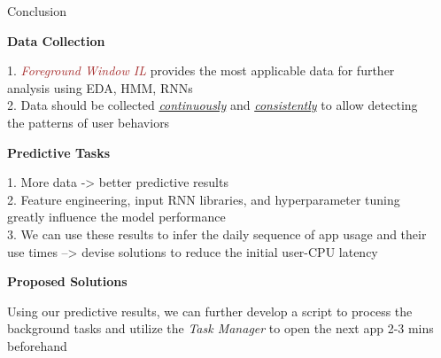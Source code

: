 \documentclass[final]{beamer}
\newlength{\sepwidth}
\newlength{\colwidth}
\newcommand{\separatorcolumn}{\begin{column}{\sepwidth}\end{column}}
\begin{document}
\begin{frame}[t]
\begin{columns}[t]
\begin{column}{\colwidth}
\begin{block}
  \end{block}
    \begin{block} {\LARGE{Conclusion}}

    \begin{itemize}
      \large{
      \item \textbf{Data Collection} 
      
      1.  \textcolor{brown}{\textit{Foreground Window IL}} provides the most applicable data for further analysis using EDA, HMM, RNNs \\
      2. Data should be collected \underline{\textit{continuously}} and \underline{\textit{consistently}} to allow detecting the patterns of user behaviors 
      \item \textbf{Predictive Tasks} 
      
      1. More data -> better predictive results \\
      2. Feature engineering, input RNN libraries, and hyperparameter tuning greatly influence the model performance \\
      3. We can use these results to infer the daily sequence of app usage and their use times --> devise solutions to reduce the initial user-CPU latency
    
      \item \textbf{Proposed Solutions}
      
      Using our predictive results, we can further develop a script to process the background tasks and utilize the \textit{Task Manager} to open the next app 2-3 mins beforehand \\
      }
      
    \end{itemize}
  \end{block}

  



\end{column}

\separatorcolumn
\end{columns}
\end{frame}
\end{document}
